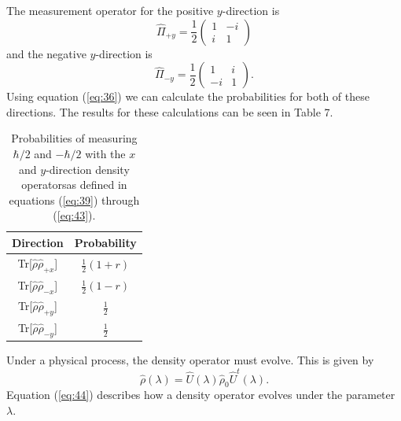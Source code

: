 \documentclass[twocolumn]{article}
\begin{document}
The measurement operator for the positive $y$-direction is
\begin{equation} \label{eq:42}
\hat{\Pi}_{+y}=\frac{1}{2}
\begin{pmatrix}
1 & -i \\
i & 1
\end{pmatrix}
\end{equation}
and the negative $y$-direction is
\begin{equation} \label{eq:43}
\hat{\Pi}_{-y}=\frac{1}{2}
\begin{pmatrix}
1 & i \\
-i & 1
\end{pmatrix}.
\end{equation}
Using equation (\ref{eq:36}) we can calculate the probabilities for both of these directions. The results for these calculations can be seen in Table 7.
\begin{table}[h!]
\begin{center}
\begin{tabular}{ |c|c| }
\hline Direction & Probability \\
\hline Tr[$\hat{\rho}\hat{\rho}_{+x}$] & $\frac{1}{2}(1+r)$ \\
\hline Tr[$\hat{\rho}\hat{\rho}_{-x}$] & $\frac{1}{2}(1-r)$ \\
\hline Tr[$\hat{\rho}\hat{\rho}_{+y}$] & $\frac{1}{2}$ \\
\hline Tr[$\hat{\rho}\hat{\rho}_{-y}$] & $\frac{1}{2}$ \\
\hline
\end{tabular} 
\caption{Probabilities of measuring $\hbar/2$ and $-\hbar/2$ with the $x$ and $y$-direction density operatorsas defined in equations (\ref{eq:39}) through (\ref{eq:43}).}
\end{center}
\end{table}
\newline 
Under a physical process, the density operator must evolve. This is given by
\begin{equation} \label{eq:44}
\hat{\rho}(\lambda)=\hat{U}(\lambda)\hat{\rho}_0\hat{U}^{t}(\lambda).
\end{equation}
Equation (\ref{eq:44}) describes how a density operator evolves under the parameter $\lambda$. 
\end{document}
